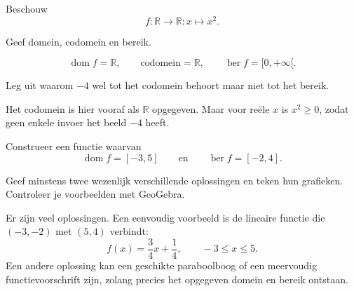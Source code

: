 \documentclass{ximera}
\begin{document}
\begin{oefening}{\oefU\ESS}

Beschouw
\[
f:\mathbb{R}\to\mathbb{R}:x\mapsto x^2.
\]

\begin{question}
Geef domein, codomein en bereik.

\begin{oplossing}
\[
\operatorname{dom}f=\mathbb{R},
\qquad
\text{codomein}=\mathbb{R},
\qquad
\operatorname{ber}f=[0,+\infty[.
\]
\end{oplossing}
\end{question}

\begin{question}
Leg uit waarom \(-4\) wel tot het codomein behoort maar niet tot het bereik.

\begin{oplossing}
Het codomein is hier vooraf als \(\mathbb R\) opgegeven. Maar voor reële \(x\)
is \(x^2\geq0\), zodat geen enkele invoer het beeld \(-4\) heeft.
\end{oplossing}
\end{question}

\end{oefening}



\begin{oefening}{\oefG}

Construeer een functie waarvan
\[
\operatorname{dom}f=[-3,5]
\qquad\text{en}\qquad
\operatorname{ber}f=[-2,4].
\]

Geef minstens twee wezenlijk verschillende oplossingen en teken hun grafieken.
Controleer je voorbeelden met GeoGebra.

\begin{oplossing}
Er zijn veel oplossingen. Een eenvoudig voorbeeld is de lineaire functie
die \((-3,-2)\) met \((5,4)\) verbindt:
\[
f(x)=\frac34x+\frac14,\qquad -3\leq x\leq5.
\]
Een andere oplossing kan een geschikte paraboolboog of een meervoudig
functievoorschrift zijn, zolang precies het opgegeven domein en bereik ontstaan.
\end{oplossing}

\end{oefening}
\end{document}
